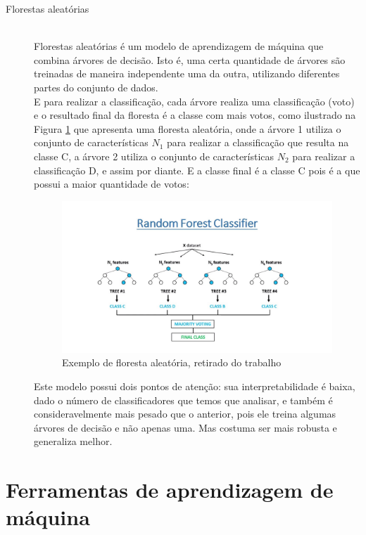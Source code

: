 \begin{description}
    \item[Florestas aleatórias] \hfill \\ Florestas aleatórias é um modelo de aprendizagem 
    de máquina que combina árvores de decisão. Isto é, uma certa quantidade de árvores são 
    treinadas de maneira independente uma da outra, utilizando diferentes partes do conjunto de 
    dados. \\ 
    E para realizar a classificação, cada árvore realiza uma classificação (voto) e o resultado 
    final da floresta é a classe com mais votos, como ilustrado na   Figura \ref{fig:ex_random_forest}
    que apresenta uma floresta aleatória, onde a árvore 1 utiliza o conjunto de características $N_1$ 
    para realizar a classificação que resulta na classe C, a árvore 2 utiliza o conjunto de características $N_2$ 
    para realizar a classificação D, e assim por diante. E a classe final é a classe C pois é a que possui a maior quantidade de votos: \\

    \begin{figure}
        \centering
        \includegraphics[width=.9\textwidth]{figuras/ex_random_forest.jpg}
        \caption{Exemplo de floresta aleatória, retirado do trabalho \cite{ref:imagem_random_forest} \label{fig:ex_random_forest}}
    \end{figure}

    Este modelo possui dois pontos de atenção: sua interpretabilidade é baixa, dado o número de 
    classificadores que temos que analisar, e também é consideravelmente mais pesado que o anterior, 
    pois ele treina algumas árvores de decisão e não apenas uma. Mas costuma ser mais robusta e 
    generaliza melhor.
\end{description}

\section{Ferramentas de aprendizagem de máquina}

